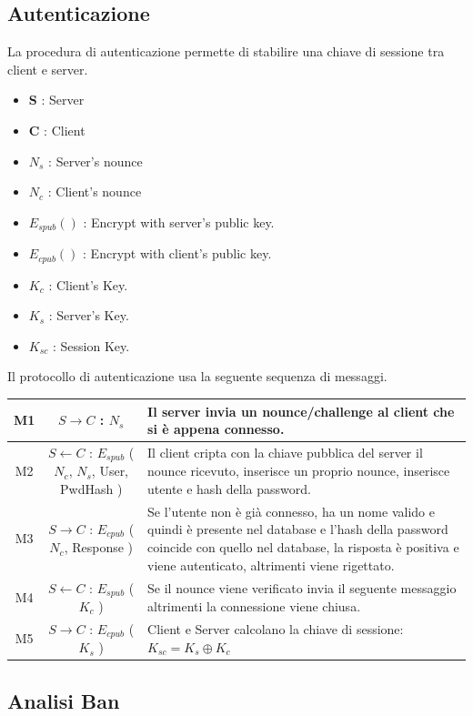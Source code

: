 \documentclass[a4paper,titlepage]{article}
\begin{document}
\subsection{Autenticazione}
La procedura di autenticazione permette di stabilire una chiave di sessione tra client e server.
\begin{itemize}
\item \textbf{S} : Server
\item \textbf{C} : Client
\item $N_s$ : Server's nounce
\item $N_c$ : Client's nounce
\item $E_{spub} ()$ : Encrypt with server's public key. 
\item $E_{cpub} ()$ : Encrypt with client's public key.
\item $K_c$ : Client's Key.
\item $K_s$ : Server's Key.
\item $K_{sc}$ : Session Key.
\end{itemize}
Il protocollo di autenticazione usa la seguente sequenza di messaggi.
\begin{center}
    \begin{tabular}{ | c | c | p{6cm} |}
    \hline
    M1 & $S \rightarrow C$ : $N_s$ & Il server invia un nounce/challenge al client che si è appena connesso. \\ \hline
    M2 &  $S \leftarrow C$ : $E_{spub}$ ( $N_c$, $N_s$, User, PwdHash ) & Il client cripta con la chiave pubblica del server il nounce ricevuto, inserisce un proprio nounce, inserisce utente e hash della password. \\ \hline
    M3 & $S \rightarrow C$ : $E_{cpub}$ ( $N_c$, Response ) & Se l'utente non è già connesso, ha un nome valido e quindi è presente nel database e l'hash della password coincide con quello nel database, la risposta è positiva e viene autenticato, altrimenti viene rigettato. \\ \hline
    M4 & $S \leftarrow C$ : $E_{spub}$ ( $K_c$ ) & Se il nounce viene verificato invia il seguente messaggio altrimenti la connessione viene chiusa.\\ \hline
    M5 & $S \rightarrow C$ : $E_{cpub}$ ( $K_s$ ) & Client e Server calcolano la chiave di sessione: $ K_{sc} = K_s \oplus K_c $ \\ \hline
    \end{tabular}
\end{center}

\subsection{Analisi Ban}
\end{document}
